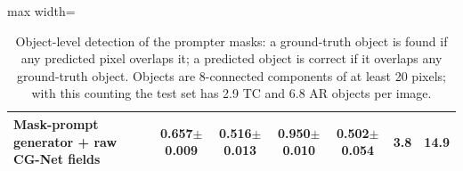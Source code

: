 \begin{table}[htbp]
\begin{adjustbox}{max width=\linewidth}
\begin{tabular}{lcccccc}
Mask-prompt generator + raw CG-Net fields & 0.657$\pm$0.009 & 0.516$\pm$0.013 & 0.950$\pm$0.010 & 0.502$\pm$0.054 & 3.8 & 14.9 \\
\bottomrule
\end{tabular}
\end{adjustbox}
\caption{Object-level detection of the prompter masks: a ground-truth object is found if any predicted pixel overlaps it; a predicted object is correct if it overlaps any ground-truth object. Objects are 8-connected components of at least 20 pixels; with this counting the test set has 2.9 TC and 6.8 AR objects per image.}
\label{tab:object_level_infused_mlp1}
\end{table}
